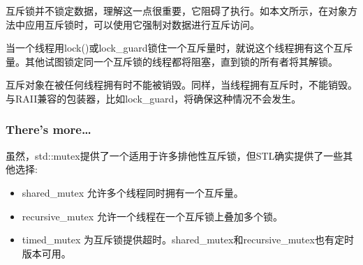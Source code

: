 互斥锁并不锁定数据，理解这一点很重要，它阻碍了执行。如本文所示，在对象方法中应用互斥锁时，可以使用它强制对数据进行互斥访问。

当一个线程用lock()或lock\_guard锁住一个互斥量时，就说这个线程拥有这个互斥量。其他试图锁定同一个互斥锁的线程都将阻塞，直到锁的所有者将其解锁。

互斥对象在被任何线程拥有时不能被销毁。同样，当线程拥有互斥时，不能销毁。与RAII兼容的包装器，比如lock\_guard，将确保这种情况不会发生。

\subsubsection{There's more…}

虽然，std::mutex提供了一个适用于许多排他性互斥锁，但STL确实提供了一些其他选择:

\begin{itemize}
\item 
shared\_mutex 允许多个线程同时拥有一个互斥量。

\item 
recursive\_mutex 允许一个线程在一个互斥锁上叠加多个锁。

\item 
timed\_mutex 为互斥锁提供超时。shared\_mutex和recursive\_mutex也有定时版本可用。
\end{itemize}












